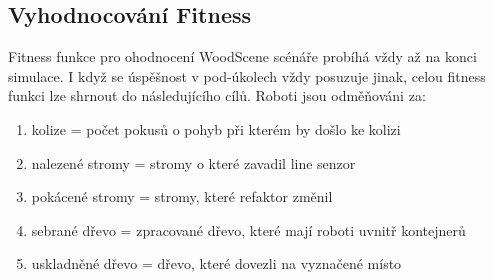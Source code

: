 \subsection{Vyhodnocování Fitness}
Fitness funkce pro ohodnocení WoodScene scénáře probíhá vždy až na konci simulace. I když se úspěšnost v pod-úkolech  vždy posuzuje jinak, celou fitness funkci lze shrnout do následujícího cílů. Roboti jsou odměňováni za: 
\begin{enumerate}
        \item kolize = počet pokusů o pohyb při kterém by došlo ke kolizi 
        \item nalezené stromy = stromy o které zavadil line senzor 
        \item pokácené stromy = stromy, které refaktor změnil 
        \item sebrané dřevo = zpracované dřevo, které mají roboti uvnitř kontejnerů 
        \item uskladněné dřevo = dřevo, které dovezli na vyznačené místo 
\end{enumerate}

